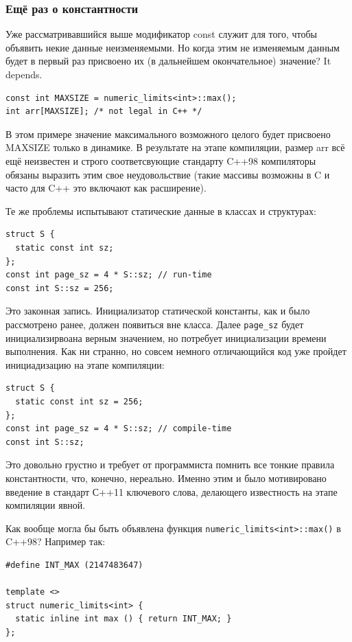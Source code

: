\documentclass[a4paper,12pt,oneside]{article}
\begin{document}
\subsubsection{Ещё раз о константности}\label{Constexpr}

Уже рассматривавшийся выше модификатор const служит для того, чтобы объявить некие данные неизменяемыми. Но когда этим не изменяемым данным будет в первый раз присвоено их (в дальнейшем окончательное) значение? It depends.

\begin{lstlisting}
const int MAXSIZE = numeric_limits<int>::max();
int arr[MAXSIZE]; /* not legal in C++ */
\end{lstlisting}

В этом примере значение максимального возможного целого будет присвоено MAXSIZE только в динамике. В результате на этапе компиляции, размер arr всё ещё неизвестен и строго соответсвующие стандарту C++98 компиляторы обязаны выразить этим свое неудовольствие (такие массивы возможны в C и часто для C++ это включают как расширение).

Те же проблемы испытывают статические данные в классах и структурах:

\begin{lstlisting}
struct S {
  static const int sz;
};
const int page_sz = 4 * S::sz; // run-time
const int S::sz = 256; 
\end{lstlisting}

Это законная запись. Инициализатор статической константы, как и было рассмотрено ранее, должен появиться вне класса. Далее \lstinline!page_sz! будет инициализирвоана верным значением, но потребует инициализации времени выполнения. Как ни странно, но совсем немного отличающийся код уже пройдет инициадизацию на этапе компиляции:

\begin{lstlisting}
struct S {
  static const int sz = 256;
};
const int page_sz = 4 * S::sz; // compile-time
const int S::sz;
\end{lstlisting}

Это довольно грустно и требует от программиста помнить все тонкие правила константности, что, конечно, нереально. Именно этим и было мотивировано введение в стандарт С++11 ключевого слова, делающего известность на этапе компиляции явной.

Как вообще могла бы быть объявлена функция \lstinline!numeric_limits<int>::max()! в C++98? Например так:

\begin{lstlisting}
#define INT_MAX (2147483647)

template <>
struct numeric_limits<int> {
  static inline int max () { return INT_MAX; }
};
\end{lstlisting}
\end{document}
